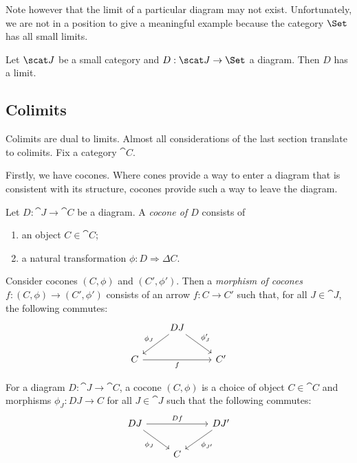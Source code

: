 \documentclass{article}
\begin{document}
Note however that the limit of a particular diagram may not exist. Unfortunately, we
are not in a position to give a meaningful example because the category $\Set$ has
all small limits.

\begin{theorem}
  Let $\scat J$ be a small category and $D:\scat J\to\Set$ a diagram. Then $D$ has a limit.
\end{theorem}

\subsection{Colimits}

Colimits are dual to limits. Almost all considerations of the last section translate
to colimits. Fix a category $\cat{C}$.

Firstly, we have cocones. Where cones provide a way to enter a diagram that is consistent
with its structure, cocones provide such a way to leave the diagram.

\begin{definition}
  Let $D:\cat{J}\to\cat{C}$ be a diagram. A \emph{cocone of $D$} consists of
  \begin{enumerate}
    \item an object $C\in\cat{C}$;
    \item a natural transformation $\phi:D\Rightarrow\Delta C$.
  \end{enumerate}
  Consider cocones $(C,\phi)$ and $(C',\phi')$. Then a \emph{morphism of cocones $f:(C,\phi)\to(C',\phi')$} consists of
  an arrow $f:C\to C'$ such that, for all $J\in\cat{J}$, the following
  commutes:
  \begin{equation}
    \begin{tikzcd}
  & DJ \\
      C && {C'}
      \arrow["f"', from=2-1, to=2-3]
      \arrow["{\phi_J'}", from=1-2, to=2-3]
      \arrow["{\phi_J}"', from=1-2, to=2-1]
    \end{tikzcd}
  \end{equation}
\end{definition}

For a diagram $D:\cat{J}\to\cat{C}$, a cocone $(C,\phi)$ is a choice of object
$C\in\cat{C}$ and morphisms $\phi_J:DJ\to C$ for all $J\in\cat{J}$ such that
the following commutes:
\begin{equation}
  \begin{tikzcd}
    DJ && {DJ'} \\
       & C
       \arrow["Df", from=1-1, to=1-3]
       \arrow["{\phi_{J'}}", from=1-3, to=2-2]
       \arrow["{\phi_J}"', from=1-1, to=2-2]
  \end{tikzcd}
\end{equation}
\end{document}

